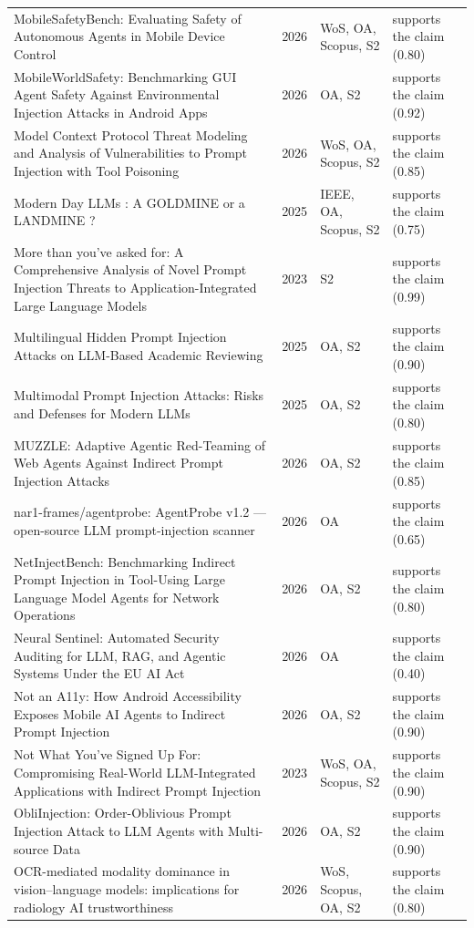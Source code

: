 \begin{longtable}{@{}%
  >{\raggedright\arraybackslash}p{}c%
  >{\raggedright\arraybackslash}p{}%
  >{\raggedright\arraybackslash}p{}@{}}
MobileSafetyBench: Evaluating Safety of Autonomous Agents in Mobile Device Control & 2026 & WoS, OA, Scopus, S2 & supports the claim (0.80) \\
MobileWorldSafety: Benchmarking GUI Agent Safety Against Environmental Injection Attacks in Android Apps & 2026 & OA, S2 & supports the claim (0.92) \\
Model Context Protocol Threat Modeling and Analysis of Vulnerabilities to Prompt Injection with Tool Poisoning & 2026 & WoS, OA, Scopus, S2 & supports the claim (0.85) \\
Modern Day LLMs : A GOLDMINE or a LANDMINE ? & 2025 & IEEE, OA, Scopus, S2 & supports the claim (0.75) \\
More than you've asked for: A Comprehensive Analysis of Novel Prompt Injection Threats to Application-Integrated Large Language Models & 2023 & S2 & supports the claim (0.99) \\
Multilingual Hidden Prompt Injection Attacks on LLM-Based Academic Reviewing & 2025 & OA, S2 & supports the claim (0.90) \\
Multimodal Prompt Injection Attacks: Risks and Defenses for Modern LLMs & 2025 & OA, S2 & supports the claim (0.80) \\
MUZZLE: Adaptive Agentic Red-Teaming of Web Agents Against Indirect Prompt Injection Attacks & 2026 & OA, S2 & supports the claim (0.85) \\
nar1-frames/agentprobe: AgentProbe v1.2 --- open-source LLM prompt-injection scanner & 2026 & OA & supports the claim (0.65) \\
NetInjectBench: Benchmarking Indirect Prompt Injection in Tool-Using Large Language Model Agents for Network Operations & 2026 & OA, S2 & supports the claim (0.80) \\
Neural Sentinel: Automated Security Auditing for LLM, RAG, and Agentic Systems Under the EU AI Act & 2026 & OA & supports the claim (0.40) \\
Not an A11y: How Android Accessibility Exposes Mobile AI Agents to Indirect Prompt Injection & 2026 & OA, S2 & supports the claim (0.90) \\
Not What You've Signed Up For: Compromising Real-World LLM-Integrated Applications with Indirect Prompt Injection & 2023 & WoS, OA, Scopus, S2 & supports the claim (0.90) \\
ObliInjection: Order-Oblivious Prompt Injection Attack to LLM Agents with Multi-source Data & 2026 & OA, S2 & supports the claim (0.90) \\
OCR-mediated modality dominance in vision--language models: implications for radiology AI trustworthiness & 2026 & WoS, Scopus, OA, S2 & supports the claim (0.80) \\

\end{longtable}
